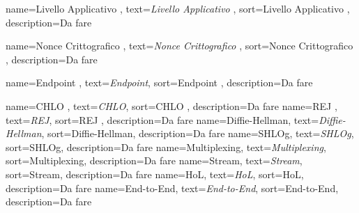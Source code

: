  {
    name=Livello Applicativo ,
    text=\emph{Livello Applicativo },
    sort=Livello Applicativo ,
    description={Da fare}
}

 {
    name=Nonce Crittografico ,
    text=\emph{Nonce Crittografico },
    sort=Nonce Crittografico ,
    description={Da fare}
}

 {
    name=Endpoint ,
    text=\emph{Endpoint},
    sort=Endpoint ,
    description={Da fare}
}

 {
    name=CHLO ,
    text=\emph{CHLO},
    sort=CHLO ,
    description={Da fare}
}
 {
    name=REJ ,
    text=\emph{REJ},
    sort=REJ ,
    description={Da fare}
}
 {
    name=Diffie-Hellman,
    text=\emph{Diffie-Hellman},
    sort=Diffie-Hellman,
    description={Da fare}
}
 {
    name=SHLOg,
    text=\emph{SHLOg},
    sort=SHLOg,
    description={Da fare}
}
 {
    name=Multiplexing,
    text=\emph{Multiplexing},
    sort=Multiplexing,
    description={Da fare}
}
 {
    name=Stream,
    text=\emph{Stream},
    sort=Stream,
    description={Da fare}
}
 {
    name=HoL,
    text=\emph{HoL},
    sort=HoL,
    description={Da fare}
}
 {
    name=End-to-End,
    text=\emph{End-to-End},
    sort=End-to-End,
    description={Da fare}
}
